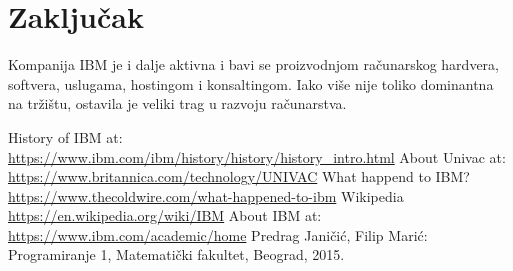 \documentclass[a4paper]{article}
\begin{document}
\section{Zaključak}
Kompanija IBM je i dalje aktivna i bavi se proizvodnjom računarskog hardvera, softvera, uslugama, hostingom i konsaltingom. Iako više nije toliko dominantna na tržištu, ostavila je veliki trag u razvoju računarstva. 

\renewcommand{\refname}{Literatura}
\begin{thebibliography}{10}

 History of IBM at:\\ \url{https://www.ibm.com/ibm/history/history/history_intro.html}
 About Univac at: \url{https://www.britannica.com/technology/UNIVAC}
 What happend to IBM?\\ \url{https://www.thecoldwire.com/what-happened-to-ibm}
 Wikipedia \url{https://en.wikipedia.org/wiki/IBM} %
 About IBM at: \url{https://www.ibm.com/academic/home}
 Predrag Janičić, Filip Marić: Programiranje 1, Matematički fakultet, Beograd, 2015.
\end{thebibliography}
\end{document}
